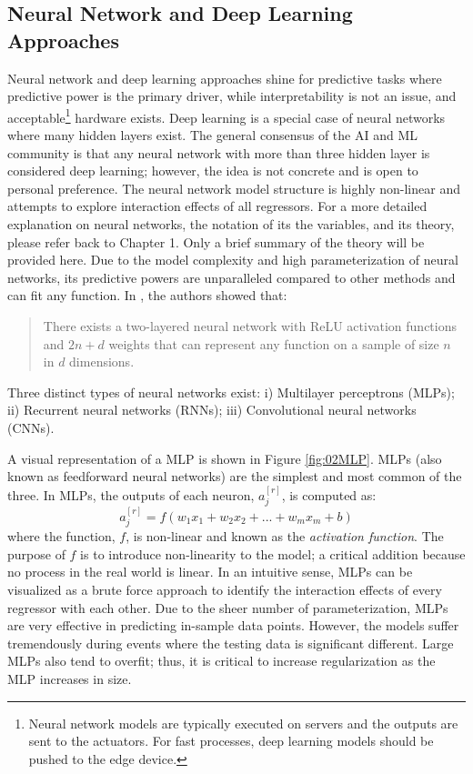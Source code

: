 \subsection{Neural Network and Deep Learning Approaches}
Neural network and deep learning approaches shine for predictive tasks where predictive power is the primary driver, while interpretability is not an issue, and acceptable\footnote{Neural network models are typically executed on servers and the outputs are sent to the actuators.  For fast processes, deep learning models should be pushed to the edge device.} hardware exists.  Deep learning is a special case of neural networks where many hidden layers exist.  The general consensus of the AI and ML community is that any neural network with more than three hidden layer is considered deep learning; however, the idea is not concrete and is open to personal preference.  The neural network model structure is highly non-linear and attempts to explore interaction effects of all regressors.  For a more detailed explanation on neural networks, the notation of its the variables, and its theory, please refer back to Chapter 1. Only a brief summary of the theory will be provided here. Due to the model complexity and high parameterization of neural networks, its predictive powers are unparalleled compared to other methods and can fit any function. In \cite{nn_fit}, the authors showed that:
\begin{framed}
\begin{quote}
There exists a two-layered neural network with ReLU activation functions and $2n+d$ weights that can represent any function on a sample of size $n$ in $d$ dimensions. 
\end{quote}
\end{framed}
Three distinct types of neural networks exist: i) Multilayer perceptrons (MLPs); ii) Recurrent neural networks (RNNs); iii) Convolutional neural networks (CNNs).

A visual representation of a MLP is shown in Figure \ref{fig:02MLP}.  MLPs (also known as feedforward neural networks) are the simplest and most common of the three.  In MLPs, the outputs of each neuron, $a_j^{[r]}$, is computed as:
\begin{equation}
    a_j^{[r]} = f(w_1x_1 + w_2x_2 + ... + w_mx_m + b)
\end{equation}
where the function, $f$, is non-linear and known as the \textit{activation function}.  The purpose of $f$ is to introduce non-linearity to the model; a critical addition because no process in the real world is linear.  In an intuitive sense, MLPs can be visualized as a brute force approach to identify the interaction effects of every regressor with each other. Due to the sheer number of parameterization, MLPs are very effective in predicting in-sample data points.  However, the models suffer tremendously during events where the testing data is significant different.  Large MLPs also tend to overfit; thus, it is critical to increase regularization as the MLP increases in size.

